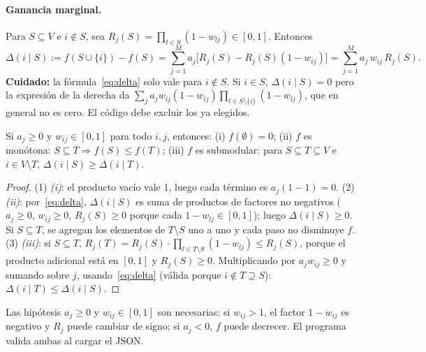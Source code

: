 \paragraph{Ganancia marginal.} Para $S\subseteq V$ e $i\notin S$, sea $R_j(S)=\prod_{l\in S}(1-w_{lj})\in[0,1]$. Entonces
\begin{equation}\label{eq:delta}
\Delta(i\mid S):=f(S\cup\{i\})-f(S)=\sum_{j=1}^{M}a_j\bigl[R_j(S)-R_j(S)(1-w_{ij})\bigr]=\sum_{j=1}^{M}a_j\,w_{ij}\,R_j(S).
\end{equation}
\textbf{Cuidado:} la fórmula~\eqref{eq:delta} solo vale para $i\notin S$. Si $i\in S$, $\Delta(i\mid S)=0$ pero la expresión de la derecha da $\sum_j a_j w_{ij}(1-w_{ij})\prod_{l\in S\setminus\{i\}}(1-w_{lj})$, que en general no es cero. El código debe excluir los ya elegidos.

\begin{lema}\label{lem:submodular}
Si $a_j\ge 0$ y $w_{ij}\in[0,1]$ para todo $i,j$, entonces:
(i) $f(\emptyset)=0$; (ii) $f$ es monótona: $S\subseteq T\Rightarrow f(S)\le f(T)$; (iii) $f$ es submodular: para $S\subseteq T\subseteq V$ e $i\in V\setminus T$, $\Delta(i\mid S)\ge \Delta(i\mid T)$.
\end{lema}
\begin{proof}
(1) \emph{(i)}: el producto vacío vale 1, luego cada término es $a_j(1-1)=0$.
(2) \emph{(ii)}: por~\eqref{eq:delta}, $\Delta(i\mid S)$ es suma de productos de factores no negativos ($a_j\ge0$, $w_{ij}\ge0$, $R_j(S)\ge 0$ porque cada $1-w_{lj}\in[0,1]$); luego $\Delta(i\mid S)\ge 0$. Si $S\subseteq T$, se agregan los elementos de $T\setminus S$ uno a uno y cada paso no disminuye $f$.
(3) \emph{(iii)}: si $S\subseteq T$, $R_j(T)=R_j(S)\cdot\prod_{l\in T\setminus S}(1-w_{lj})\le R_j(S)$, porque el producto adicional está en $[0,1]$ y $R_j(S)\ge0$. Multiplicando por $a_jw_{ij}\ge 0$ y sumando sobre $j$, usando~\eqref{eq:delta} (válida porque $i\notin T\supseteq S$): $\Delta(i\mid T)\le\Delta(i\mid S)$.
\end{proof}
\begin{observacion}
Las hipótesis $a_j\ge 0$ y $w_{ij}\in[0,1]$ son necesarias: si $w_{ij}>1$, el factor $1-w_{ij}$ es negativo y $R_j$ puede cambiar de signo; si $a_j<0$, $f$ puede decrecer. El programa valida ambas al cargar el JSON.
\end{observacion}

